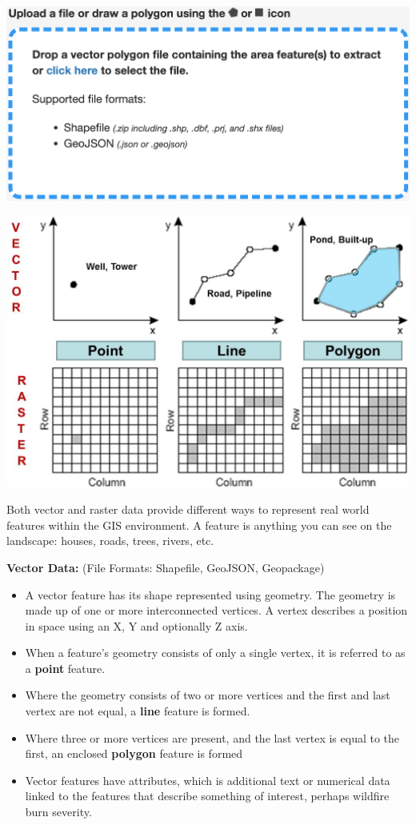 \documentclass[oneside,a4paper,11pt,explicit]{book}
\begin{document}
\vspace{1em}

\centerline{\includegraphics[width=.5\textwidth]{BlankExtract.png}}

\begin{tcolorbox}[colback=yellow!5!white,colframe=IceCreamLeaf,title=\textbf{Vector vs Raster Data}]

	\centerline{\includegraphics[width=.75\textwidth]{Vector_vs_Raster.png}}

	Both vector and raster data provide different ways to represent real world features within the GIS environment. A feature is anything you can see on the landscape: houses, roads, trees, rivers, etc. 

	\vspace{.5em}

	\textbf{Vector Data:} (File Formats: Shapefile, GeoJSON, Geopackage)
	\begin{itemize}
		\item A vector feature has its shape represented using geometry. The geometry is made up of one or more interconnected vertices. A vertex describes a position in space using an X, Y and optionally Z axis.
		\item When a feature's geometry consists of only a single vertex, it is referred to as a \textbf{point} feature.
		\item Where the geometry consists of two or more vertices and the first and last vertex are not equal, a \textbf{line} feature is formed.
		\item Where three or more vertices are present, and the last vertex is equal to the first, an enclosed \textbf{polygon} feature is formed 
		\item Vector features have attributes, which is additional text or numerical data linked to the features that describe something of interest, perhaps wildfire burn severity.
	\end{itemize}


\end{tcolorbox}
\end{document}
